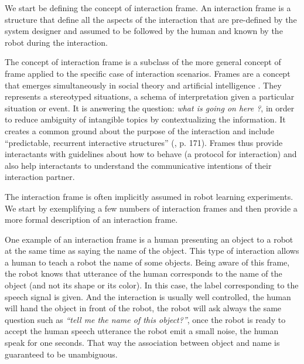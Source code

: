 We start be defining the concept of interaction frame. An interaction frame is a structure that define all the aspects of the interaction that are pre-defined by the system designer and assumed to be followed by the human and known by the robot during the interaction.

The concept of interaction frame is a subclass of the more general concept of frame applied to the specific case of interaction scenarios. Frames are a concept that emerges simultaneously in social theory \cite{goffman1974frame} and artificial intelligence \cite{minsky1974framework}. They represents a stereotyped situations, a schema of interpretation given a particular situation or event. It is answering the question: \emph{what is going on here ?}, in order to reduce ambiguity of intangible topics by contextualizing the information. It creates a common ground about the purpose of the interaction \cite{tomasello2009cultural,rohlfing2013learning} and include ``predictable, recurrent interactive structures'' (\cite{ninio1996pragmatic}, p. 171). Frames thus provide interactants with guidelines about how to behave (a protocol for interaction) and also help interactants to understand the communicative intentions of their interaction partner.

The interaction frame is often implicitly assumed in robot learning experiments. We start by exemplifying a few numbers of interaction frames and then provide a more formal description of an interaction frame.

One example of an interaction frame is a human presenting an object to a robot at the same time as saying the name of the object. This type of interaction allows a human to teach a robot the name of some objects. Being aware of this frame, the robot knows that utterance of the human corresponds to the name of the object (and not its shape or its color). In this case, the label corresponding to the speech signal is given. And the interaction is usually well controlled, the human will hand the object in front of the robot, the robot will ask always the same question such as \emph{``tell me the name of this object?''}, once the robot is ready to accept the human speech utterance the robot emit a small noise, the human speak for one seconds. That way the association between object and name is guaranteed to be unambiguous.

